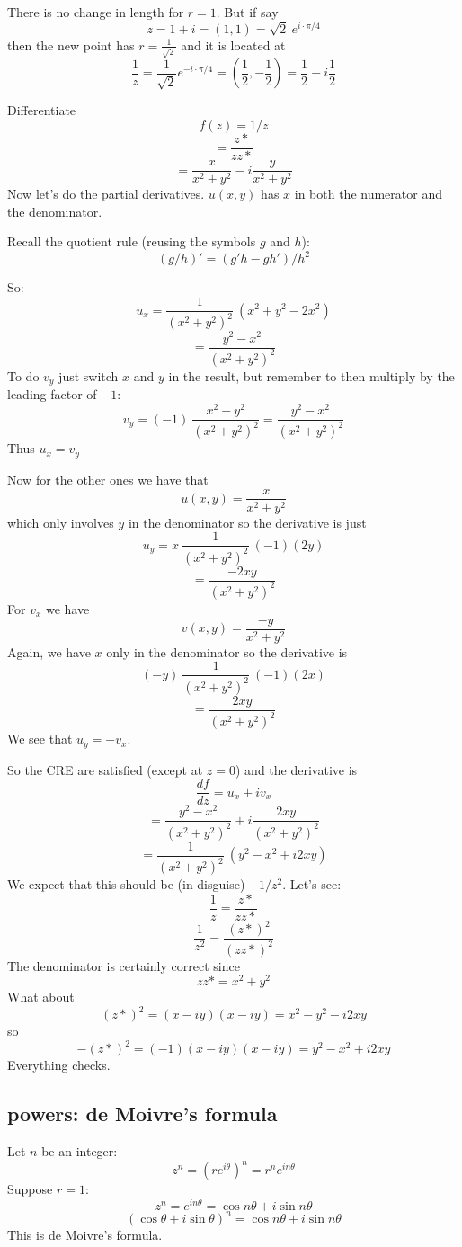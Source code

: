 \documentclass[11pt, oneside]{article}   	%
\begin{document}
There is no change in length for $r=1$.  But if say 
\[ z = 1 + i = (1,1) = \sqrt{2} \ e^{i \cdot \pi/4} \]
then the new point has $r = \frac{1}{\sqrt{2}}$ and it is located at
\[ \frac{1}{z} = \frac{1}{\sqrt{2}} e^{-i \cdot \pi/4} = (\frac{1}{2},- \frac{1}{2}) = \frac{1}{2} - i \frac{1}{2}\]

Differentiate
\[ f(z) = 1/z \]
\[ = \frac{z*}{zz*} \]
\[ = \frac{x}{x^2 + y^2} - i\frac{y}{x^2 + y^2} \]
Now let's do the partial derivatives.  $u(x,y)$ has $x$ in both the numerator and the denominator.

Recall the quotient rule (reusing the symbols $g$ and $h$):
\[ (g/h)' = (g'h - gh')/h^2 \]

So:
\[ u_x = \frac{1}{(x^2 + y^2)^2} \ (x^2 + y^2 - 2x^2) \]
\[ = \frac{y^2 - x^2}{(x^2 + y^2)^2} \]
To do $v_y$ just switch $x$ and $y$ in the result, but remember to then multiply by the leading factor of $-1$:
\[ v_y = (-1) \ \frac{x^2 - y^2}{(x^2 + y^2)^2} = \frac{y^2 - x^2}{(x^2 + y^2)^2} \]
Thus $u_x = v_y$

Now for the other ones we have that
\[ u(x,y) = \frac{x}{x^2 + y^2} \]
which only involves $y$ in the denominator so the derivative is just
\[ u_y = x \ \frac{1}{(x^2 + y^2)^2} \ (-1) (2y) \]
\[ = \frac{-2xy}{(x^2 + y^2)^2} \]
For $v_x$ we have 
\[ v(x,y) = \frac{-y}{x^2 + y^2} \]
Again, we have $x$ only in the denominator so the derivative is
\[ (-y) \ \frac{1}{(x^2 + y^2)^2} \ (-1) (2x) \]
\[ = \frac{2xy}{(x^2 + y^2)^2} \]
We see that $u_y = - v_x$.

So the CRE are satisfied (except at $z=0$) and the derivative is
\[ \frac{df}{dz} = u_x + i v_x \]
\[ =  \frac{y^2 - x^2}{(x^2 + y^2)^2} + i \frac{2xy}{(x^2 + y^2)^2} \]
\[ = \frac{1}{(x^2 + y^2)^2} \ (y^2 - x^2 + i2xy) \]
We expect that this should be (in disguise) $-1/z^2$.  Let's see:
\[ \frac{1}{z} =  \frac{z*}{zz*} \]
\[ \frac{1}{z^2} =  \frac{(z*)^2}{(zz*)^2} \]
The denominator is certainly correct since
\[ zz* = x^2 + y^2 \]
What about
\[ (z*)^2 = (x - iy)(x - iy) = x^2 - y^2 - i2xy \]
so
\[ -(z*)^2 = (-1)(x - iy)(x - iy) = y^2 - x^2 + i2xy \]
Everything checks.

\subsection*{powers:  de Moivre's formula}
Let $n$ be an integer:
\[ z^n = (re^{i\theta})^n = r^n e^{in\theta} \]
Suppose $r=1$:
\[ z^n = e^{in\theta} = \cos n \theta + i \sin n \theta \]
\[ (\cos \theta + i \sin \theta)^n = \cos n \theta + i \sin n \theta \]
This is de Moivre's formula.
\end{document}
